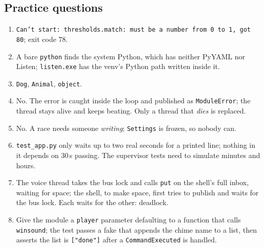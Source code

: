 \documentclass[11pt,a4paper]{article}
\begin{document}
\subsection*{Practice questions}
\begin{enumerate}[label=\textbf{\arabic*.}]
  \item \texttt{Can't start: thresholds.match: must be a number from 0 to 1, got 80}; exit code 78.
  \item A bare \texttt{python} finds the system Python, which has neither PyYAML nor Listen;
        \texttt{listen.exe} has the venv's Python path written inside it.
  \item \texttt{Dog}, \texttt{Animal}, \texttt{object}.
  \item No. The error is caught inside the loop and published as \texttt{ModuleError}; the thread
        stays alive and keeps beating. Only a thread that \emph{dies} is replaced.
  \item No. A race needs someone \emph{writing}; \texttt{Settings} is frozen, so nobody can.
  \item \texttt{test\_app.py} only waits up to two real seconds for a printed line; nothing in it
        depends on 30\,s passing. The supervisor tests need to simulate minutes and hours.
  \item The voice thread takes the bus lock and calls \texttt{put} on the shell's full inbox,
        waiting for space; the shell, to make space, first tries to publish and waits for the bus
        lock. Each waits for the other: deadlock.
  \item Give the module a \texttt{player} parameter defaulting to a function that calls
        \texttt{winsound}; the test passes a fake that appends the chime name to a list, then
        asserts the list is \texttt{["done"]} after a \texttt{CommandExecuted} is handled.
\end{enumerate}
\end{document}
